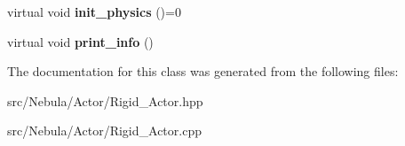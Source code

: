 \begin{DoxyCompactItemize}
\item 
\hypertarget{classNeb_1_1Actor_1_1RigidActor_a2a352164825bab033a917ccb224acaf1}{virtual void {\bfseries init\-\_\-physics} ()=0}\label{classNeb_1_1Actor_1_1RigidActor_a2a352164825bab033a917ccb224acaf1}

\item 
\hypertarget{classNeb_1_1Actor_1_1RigidActor_ac2d9884ccfd06459285738272879f622}{virtual void {\bfseries print\-\_\-info} ()}\label{classNeb_1_1Actor_1_1RigidActor_ac2d9884ccfd06459285738272879f622}

\end{DoxyCompactItemize}


\-The documentation for this class was generated from the following files\-:\begin{DoxyCompactItemize}
\item 
src/\-Nebula/\-Actor/\-Rigid\-\_\-\-Actor.\-hpp\item 
src/\-Nebula/\-Actor/\-Rigid\-\_\-\-Actor.\-cpp\end{DoxyCompactItemize}
